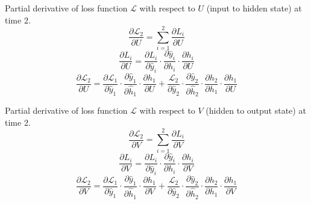 \documentclass[12pt,a4paper]{article}
\begin{document}
Partial derivative of loss function $\mathcal{L}$ with respect to $U$ (input to hidden state) at time 2.\\
\begin{equation}
    \dfrac{\partial\mathcal{L}_2}{\partial{U}} = \sum_{i=1}^{2}\dfrac{\partial L_i}{\partial U}
\end{equation}
\begin{equation}
    \dfrac{\partial L_i}{\partial U} = \dfrac{\partial L_i}{\partial \hat{y}_i} \cdot \dfrac{\partial \hat{y}_i}{\partial h_i} \cdot \dfrac{\partial h_i}{\partial U}
\end{equation}
\begin{equation}
    \dfrac{\partial\mathcal{L}_2}{\partial U} = \dfrac{\partial\mathcal{L}_1}{\partial\hat{y}_1}\cdot\dfrac{\partial\hat{y}_1}{\partial\hat{h}_1}\cdot\dfrac{\partial h_1}{\partial U}+\dfrac{\mathcal{L}_2}{\partial\hat{y}_2}\cdot\dfrac{\partial\hat{y}_2}{\partial\hat{h}_2}\cdot\dfrac{\partial h_2}{\partial h_1}\cdot\dfrac{\partial h_1}{\partial U}
\end{equation}

Partial derivative of loss function $\mathcal{L}$ with respect to $V$ (hidden to output state) at time 2.\\
\begin{equation}
    \dfrac{\partial\mathcal{L}_2}{\partial{V}} = \sum_{i=1}^{2}\dfrac{\partial L_i}{\partial V}
\end{equation}
\begin{equation}
    \dfrac{\partial L_i}{\partial V} = \dfrac{\partial L_i}{\partial \hat{y}_i} \cdot \dfrac{\partial \hat{y}_i}{\partial h_i} \cdot \dfrac{\partial h_i}{\partial V}
\end{equation}
\begin{equation}
    \dfrac{\partial\mathcal{L}_2}{\partial V} = \dfrac{\partial\mathcal{L}_1}{\partial\hat{y}_1}\cdot\dfrac{\partial\hat{y}_1}{\partial\hat{h}_1}\cdot\dfrac{\partial h_1}{\partial V}+\dfrac{\mathcal{L}_2}{\partial\hat{y}_2}\cdot\dfrac{\partial\hat{y}_2}{\partial\hat{h}_2}\cdot\dfrac{\partial h_2}{\partial h_1}\cdot\dfrac{\partial h_1}{\partial V}
\end{equation}
\end{document}
